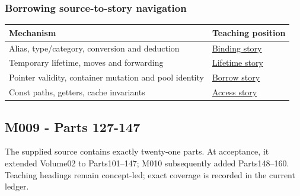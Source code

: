 \subsubsection{Borrowing source-to-story navigation}\label{borrowing-source-to-story-navigation}

{\def\LTcaptype{none} %
\begin{longtable}[]{@{}
  >{\raggedright\arraybackslash}p{}
  >{\raggedright\arraybackslash}p{}@{}}
\toprule\noalign{}
\begin{minipage}[b]{\linewidth}\raggedright
Mechanism
\end{minipage} & \begin{minipage}[b]{\linewidth}\raggedright
Teaching position
\end{minipage} \\
\midrule\noalign{}
\endhead
\bottomrule\noalign{}
\endlastfoot
Alias, type/category, conversion and deduction & \href{Continuous\%20Notes/Computing\%20Foundations\%20-\%20From\%20Bits\%20to\%20C++\%20and\%20Systems\%20APIs\#Giving\%20another\%20name\%20to\%20a\%20live\%20object/}{Binding story} \\
Temporary lifetime, moves and forwarding & \href{Continuous\%20Notes/Computing\%20Foundations\%20-\%20From\%20Bits\%20to\%20C++\%20and\%20Systems\%20APIs\#A\%20temporary\%20needs\%20an\%20explicit\%20lifetime\%20story/}{Lifetime story} \\
Pointer validity, container mutation and pool identity & \href{Continuous\%20Notes/Computing\%20Foundations\%20-\%20From\%20Bits\%20to\%20C++\%20and\%20Systems\%20APIs\#When\%20a\%20valid\%20borrow\%20stops\%20naming\%20the\%20intended\%20thing/}{Borrow story} \\
Const paths, getters, cache invariants & \href{Continuous\%20Notes/Computing\%20Foundations\%20-\%20From\%20Bits\%20to\%20C++\%20and\%20Systems\%20APIs\#Read-only\%20is\%20a\%20path,\%20not\%20an\%20ownership\%20or\%20synchronization\%20promise/}{Access story} \\
\end{longtable}
}

\subsection{M009 - Parts 127-147}\label{m009---parts-127-147}

The supplied source contains exactly twenty-one parts. At acceptance, it extended Volume02 to Parts101--147; M010 subsequently added Parts148--160. Teaching headings remain concept-led; exact coverage is recorded in the current ledger.

